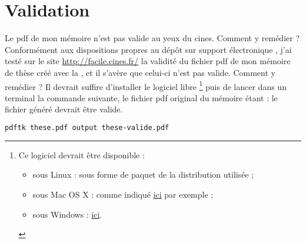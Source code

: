 \section{Validation}
\label{sec:validation}

\begin{dbfaq}{Le \acrshort{pdf} de mon mémoire n'est pas valide au yeux du
    \acrshort{cines}. Comment y remédier ?}{}
  Conformément aux dispositions propres au dépôt sur support électronique
  \autocite{guidoct-abes}, j'ai testé sur le site \url{http://facile.cines.fr/}
  la validité du fichier \acrshort{pdf} de mon mémoire de thèse créé avec la
  \yatcl{}, et il s'avère que celui-ci n'est pas valide. Comment y remédier ?
  \tcblower
  Il devrait suffire d'installer le logiciel libre \footnote{Ce
    logiciel devrait être disponible :
    \begin{itemize}
    \item sous Linux : sous forme de paquet de la distribution utilisée ;
    \item sous Mac OS X : comme indiqué
      \href{http://stackoverflow.com/q/20804441}{ici} par exemple ;
    \item sous Windows : \href{https://www.pdflabs.com/tools/pdftk-the-pdf-toolkit/}{ici}.
    \end{itemize}
  }%
  puis de lancer dans un terminal la commande suivante, le fichier
  \acrshort{pdf} original du mémoire étant  : le fichier
   généré devrait être valide.
\begin{lstlisting}[language=bash]
pdftk these.pdf output these-valide.pdf
\end{lstlisting}
\end{dbfaq}

%
\iffalse
\fi
